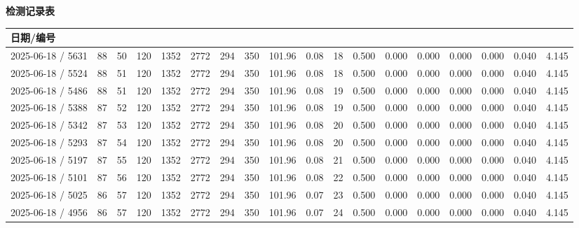 \documentclass[UTF8,10pt,a4paper,fontset=fandol]{ctexart}
\begin{document}

\newpage

\begin{center}
\textbf{检测记录表}\\[2pt]
\scriptsize
\begin{tabular}{p{1.45cm}p{0.55cm}p{0.45cm}p{0.48cm}p{0.48cm}p{0.48cm}p{0.48cm}p{0.48cm}p{0.62cm}p{0.48cm}p{0.48cm}p{0.62cm}p{0.62cm}p{0.62cm}p{0.62cm}p{0.62cm}p{0.62cm}p{0.62cm}}
\hline
日期/编号 & & & & & & & & & & & & & & & & & \\
\hline
2025-06-18 / 5631 & 88 & 50 & 120 & 1352 & 2772 & 294 & 350 & 101.96 & 0.08 & 18 & 0.500 & 0.000 & 0.000 & 0.000 & 0.000 & 0.040 & 4.145 \\
2025-06-18 / 5524 & 88 & 51 & 120 & 1352 & 2772 & 294 & 350 & 101.96 & 0.08 & 18 & 0.500 & 0.000 & 0.000 & 0.000 & 0.000 & 0.040 & 4.145 \\
2025-06-18 / 5486 & 88 & 51 & 120 & 1352 & 2772 & 294 & 350 & 101.96 & 0.08 & 19 & 0.500 & 0.000 & 0.000 & 0.000 & 0.000 & 0.040 & 4.145 \\
2025-06-18 / 5388 & 87 & 52 & 120 & 1352 & 2772 & 294 & 350 & 101.96 & 0.08 & 19 & 0.500 & 0.000 & 0.000 & 0.000 & 0.000 & 0.040 & 4.145 \\
2025-06-18 / 5342 & 87 & 53 & 120 & 1352 & 2772 & 294 & 350 & 101.96 & 0.08 & 20 & 0.500 & 0.000 & 0.000 & 0.000 & 0.000 & 0.040 & 4.145 \\
2025-06-18 / 5293 & 87 & 54 & 120 & 1352 & 2772 & 294 & 350 & 101.96 & 0.08 & 20 & 0.500 & 0.000 & 0.000 & 0.000 & 0.000 & 0.040 & 4.145 \\
2025-06-18 / 5197 & 87 & 55 & 120 & 1352 & 2772 & 294 & 350 & 101.96 & 0.08 & 21 & 0.500 & 0.000 & 0.000 & 0.000 & 0.000 & 0.040 & 4.145 \\
2025-06-18 / 5101 & 87 & 56 & 120 & 1352 & 2772 & 294 & 350 & 101.96 & 0.08 & 22 & 0.500 & 0.000 & 0.000 & 0.000 & 0.000 & 0.040 & 4.145 \\
2025-06-18 / 5025 & 86 & 57 & 120 & 1352 & 2772 & 294 & 350 & 101.96 & 0.07 & 23 & 0.500 & 0.000 & 0.000 & 0.000 & 0.000 & 0.040 & 4.145 \\
2025-06-18 / 4956 & 86 & 57 & 120 & 1352 & 2772 & 294 & 350 & 101.96 & 0.07 & 24 & 0.500 & 0.000 & 0.000 & 0.000 & 0.000 & 0.040 & 4.145 \\

\end{tabular}
\end{center}
\end{document}

